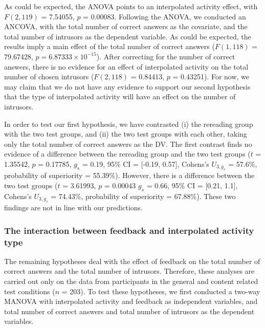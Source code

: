 \documentclass[11pt,]{article}
\begin{document}
As could be expected, the ANOVA points to an interpolated activity
effect, with \(F(2, 119)\) = 7.54055, \(p\) = 0.00083. Following the
ANOVA, we conducted an ANCOVA, with the total number of correct answers
as the covariate, and the total number of intrusors as the dependent
variable. As could be expected, the results imply a main effect of the
total number of correct answers (\(F(1, 118)\) = 79.67428,
\(p = 6.87333\times 10^{-15}\)). After correcting for the number of
correct answers, there is no evidence for an effect of interpolated
activity on the total number of chosen intrusors (\(F (2, 118)\) =
0.84413, \(p\) = 0.43251). For now, we may claim that we do not have any
evidence to support our second hypothesis that the type of interpolated
activity will have an effect on the number of intrusors.

In order to test our first hypothesis, we have contrasted (i) the
rereading group with the two test groups, and (ii) the two test groups
with each other, taking only the total number of correct answers as the
DV. The first contrast finds no evidence of a difference between the
rereading group and the two test groups (\(t\) = 1.35542, \(p\) =
0.17785, \(g_s\) = 0.19, 95\% CI = {[}-0.19, 0.57{]}, Cohens's
\(U_{3, g_s}\) = 57.6\%, probability of superiority = 55.39\%). However,
there is a difference between the two test groups (\(t\) = 3.61993,
\(p\) = 0.00043 \(g_s\) = 0.66, 95\% CI = {[}0.21, 1.1{]}, Cohens's
\(U_{3, g_s}\) = 74.43\%, probability of superiority = 67.88\%). These
two findings are not in line with our predictions.

\hypertarget{the-interaction-between-feedback-and-interpolated-activity-type}{%
\subsubsection{The interaction between feedback and interpolated
activity
type}\label{the-interaction-between-feedback-and-interpolated-activity-type}}

The remaining hypotheses deal with the effect of feedback on the total
number of correct answers and the total number of intrusors. Therefore,
these analyses are carried out only on the data from participants in the
general and content related test conditions (\(n\) = 203). To test these
hypotheses, we first conducted a two-way MANOVA with interpolated
activity and feedback as independent variables, and total number of
correct answers and total number of intrusors as the dependent
variables.

\onecolumn



\end{document}
